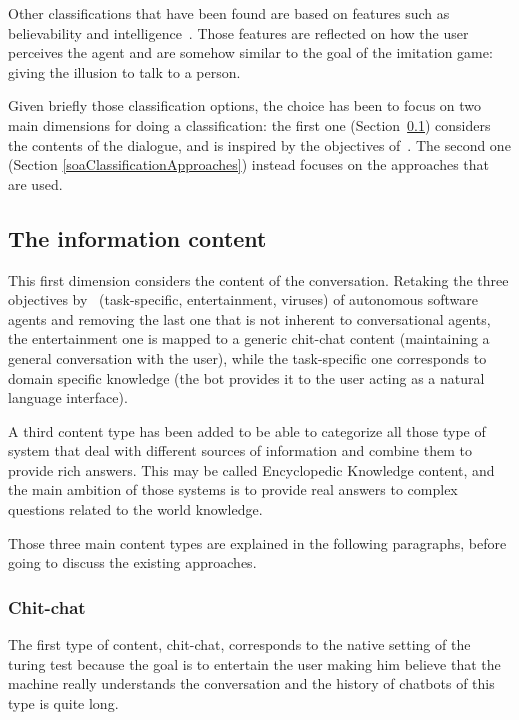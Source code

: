Other classifications that have been found are based on features such as believability and intelligence~\cite{isbister2002design}. Those features are reflected on how the user perceives the agent and are somehow similar to the goal of the imitation game: giving the illusion to talk to a person.

Given briefly those classification options, the choice has been to focus on two main dimensions for doing a classification: the first one (Section~\ref{soaClassificationContents}) considers the contents of the dialogue, and is inspired by the objectives of~\cite{franklin1996agent}. The second one (Section \ref{soaClassificationApproaches}) instead focuses on the approaches that are used.

\subsection{The information content}
\label{soaClassificationContents}

This first dimension considers the content of the conversation. Retaking the three objectives by~\cite{franklin1996agent} (task-specific, entertainment, viruses) of autonomous software agents and removing the last one that is not inherent to conversational agents, the entertainment one is mapped to a generic chit-chat content (maintaining a general conversation with the user), while the task-specific one corresponds to domain specific knowledge (the bot provides it to the user acting as a natural language interface).

A third content type has been added to be able to categorize all those type of system that deal with different sources of information and combine them to provide rich answers. This may be called Encyclopedic Knowledge content, and the main ambition of those systems is to provide real answers to complex questions related to the world knowledge.

Those three main content types are explained in the following paragraphs, before going to discuss the existing approaches.

\subsubsection{Chit-chat}
The first type of content, chit-chat, corresponds to the native setting of the turing test because the goal is to entertain the user making him believe that the machine really understands the conversation and the history of chatbots of this type is quite long.

